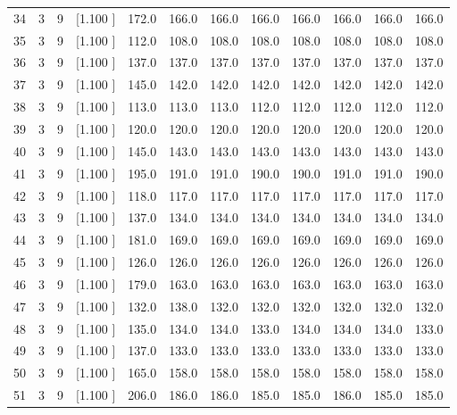 \documentclass[12pt,a4paper]{article}
\begin{document}
\begin{center}
{\begin{tabular}{r r r r r r r r r r r r}
  34&  3&  9&[1.100     ]&   172.0&   166.0&   166.0&   166.0&   166.0&   166.0&   166.0&   166.0\\[-0.02in]
  35&  3&  9&[1.100     ]&   112.0&   108.0&   108.0&   108.0&   108.0&   108.0&   108.0&   108.0\\[-0.02in]
  36&  3&  9&[1.100     ]&   137.0&   137.0&   137.0&   137.0&   137.0&   137.0&   137.0&   137.0\\[-0.02in]
  37&  3&  9&[1.100     ]&   145.0&   142.0&   142.0&   142.0&   142.0&   142.0&   142.0&   142.0\\[-0.02in]
  38&  3&  9&[1.100     ]&   113.0&   113.0&   113.0&   112.0&   112.0&   112.0&   112.0&   112.0\\[-0.02in]
  39&  3&  9&[1.100     ]&   120.0&   120.0&   120.0&   120.0&   120.0&   120.0&   120.0&   120.0\\[-0.02in]
  40&  3&  9&[1.100     ]&   145.0&   143.0&   143.0&   143.0&   143.0&   143.0&   143.0&   143.0\\[-0.02in]
  41&  3&  9&[1.100     ]&   195.0&   191.0&   191.0&   190.0&   190.0&   191.0&   191.0&   190.0\\[-0.02in]
  42&  3&  9&[1.100     ]&   118.0&   117.0&   117.0&   117.0&   117.0&   117.0&   117.0&   117.0\\[-0.02in]
  43&  3&  9&[1.100     ]&   137.0&   134.0&   134.0&   134.0&   134.0&   134.0&   134.0&   134.0\\[-0.02in]
  44&  3&  9&[1.100     ]&   181.0&   169.0&   169.0&   169.0&   169.0&   169.0&   169.0&   169.0\\[-0.02in]
  45&  3&  9&[1.100     ]&   126.0&   126.0&   126.0&   126.0&   126.0&   126.0&   126.0&   126.0\\[-0.02in]
  46&  3&  9&[1.100     ]&   179.0&   163.0&   163.0&   163.0&   163.0&   163.0&   163.0&   163.0\\[-0.02in]
  47&  3&  9&[1.100     ]&   132.0&   138.0&   132.0&   132.0&   132.0&   132.0&   132.0&   132.0\\[-0.02in]
  48&  3&  9&[1.100     ]&   135.0&   134.0&   134.0&   133.0&   134.0&   134.0&   134.0&   133.0\\[-0.02in]
  49&  3&  9&[1.100     ]&   137.0&   133.0&   133.0&   133.0&   133.0&   133.0&   133.0&   133.0\\[-0.02in]
  50&  3&  9&[1.100     ]&   165.0&   158.0&   158.0&   158.0&   158.0&   158.0&   158.0&   158.0\\[-0.02in]
  51&  3&  9&[1.100     ]&   206.0&   186.0&   186.0&   185.0&   185.0&   186.0&   185.0&   185.0\\[-0.02in]

\end{tabular}}
\end{center}
\end{document}

